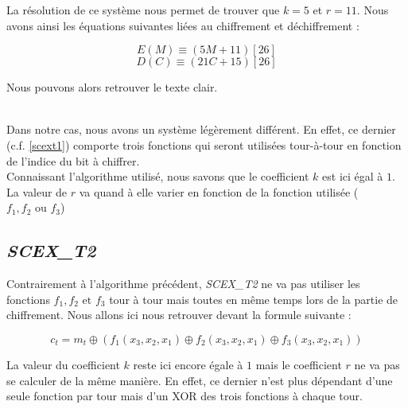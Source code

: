 La résolution de ce système nous permet de trouver que $k=5$ et $r=11$. Nous avons ainsi les équations suivantes liées au chiffrement et déchiffrement :
\begin{center}
    \begin{equation}
	E(M)\equiv (5M+11)[26]
    \end{equation}
    \begin{equation}
	D(C)\equiv (21C+15)[26]
    \end{equation}
\end{center}
Nous pouvons alors retrouver le texte clair.\\~\\\par
Dans notre cas, nous avons un système légèrement différent. En effet, ce dernier (c.f. \ref{scext1}) comporte trois fonctions qui seront utilisées tour-à-tour en fonction de l'indice du bit à chiffrer.\\
Connaissant l'algorithme utilisé, nous savons que le coefficient $k$ est ici égal à $1$. La valeur de $r$ va quand à elle varier en fonction de la fonction utilisée ($f_1, f_2 \mbox{ ou } f_3$)
\subsection{\textit{SCEX\_T2}}
Contrairement à l'algorithme précédent, \textit{SCEX\_T2} ne va pas utiliser les fonctions $f_1, f_2 \mbox{ et } f_3$ tour à tour mais toutes en même temps lors de la partie de chiffrement. Nous allons ici nous retrouver devant la formule suivante :
\begin{center}
    \begin{equation}
	c_t=m_t\oplus\left(f_1\left(x_3,x_2,x_1\right)\oplus f_2\left(x_3,x_2,x_1\right)\oplus f_3\left(x_3,x_2,x_1\right) \right)
    \end{equation}
\end{center}
La valeur du coefficient $k$ reste ici encore égale à $1$ mais le coefficient $r$ ne va pas se calculer de la même manière. En effet, ce dernier n'est plus dépendant d'une seule fonction par tour mais d'un XOR des trois fonctions à chaque tour.